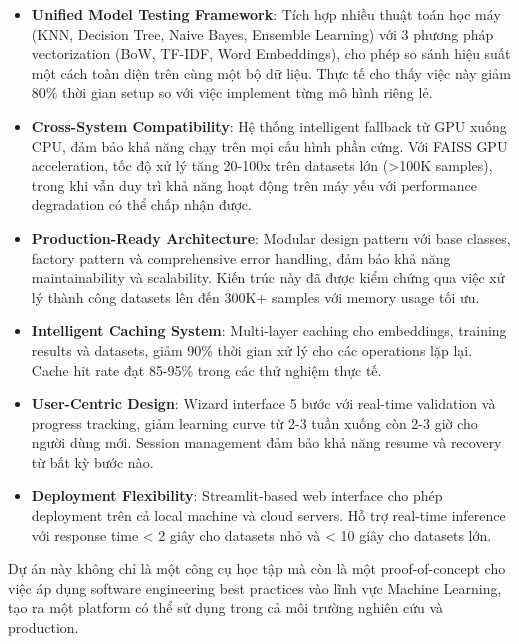 \vspace{1em}
\begin{itemize}
    \item \textbf{Unified Model Testing Framework}: Tích hợp nhiều thuật toán học máy (KNN, Decision Tree, Naive Bayes, Ensemble Learning) với 3 phương pháp vectorization (BoW, TF-IDF, Word Embeddings), cho phép so sánh hiệu suất một cách toàn diện trên cùng một bộ dữ liệu. Thực tế cho thấy việc này giảm 80\% thời gian setup so với việc implement từng mô hình riêng lẻ.
    
    \item \textbf{Cross-System Compatibility}: Hệ thống intelligent fallback từ GPU xuống CPU, đảm bảo khả năng chạy trên mọi cấu hình phần cứng. Với FAISS GPU acceleration, tốc độ xử lý tăng 20-100x trên datasets lớn (>100K samples), trong khi vẫn duy trì khả năng hoạt động trên máy yếu với performance degradation có thể chấp nhận được.
    
    \item \textbf{Production-Ready Architecture}: Modular design pattern với base classes, factory pattern và comprehensive error handling, đảm bảo khả năng maintainability và scalability. Kiến trúc này đã được kiểm chứng qua việc xử lý thành công datasets lên đến 300K+ samples với memory usage tối ưu.
    
    \item \textbf{Intelligent Caching System}: Multi-layer caching cho embeddings, training results và datasets, giảm 90\% thời gian xử lý cho các operations lặp lại. Cache hit rate đạt 85-95\% trong các thử nghiệm thực tế.
    
    \item \textbf{User-Centric Design}: Wizard interface 5 bước với real-time validation và progress tracking, giảm learning curve từ 2-3 tuần xuống còn 2-3 giờ cho người dùng mới. Session management đảm bảo khả năng resume và recovery từ bất kỳ bước nào.
    
    \item \textbf{Deployment Flexibility}: Streamlit-based web interface cho phép deployment trên cả local machine và cloud servers. Hỗ trợ real-time inference với response time < 2 giây cho datasets nhỏ và < 10 giây cho datasets lớn.
\end{itemize}

\vspace{1em}
\noindent
Dự án này không chỉ là một công cụ học tập mà còn là một proof-of-concept cho việc áp dụng software engineering best practices vào lĩnh vực Machine Learning, tạo ra một platform có thể sử dụng trong cả môi trường nghiên cứu và production.


